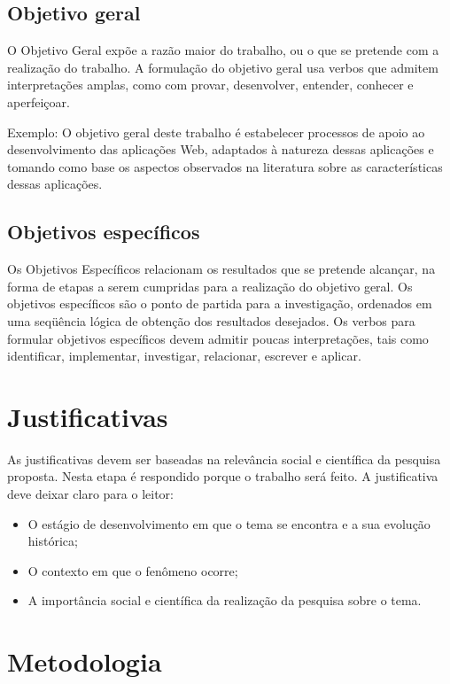 \subsection{Objetivo geral}

O Objetivo Geral expõe a razão maior do trabalho, ou o que se pretende com a
realização do trabalho. A formulação do objetivo geral usa verbos que admitem
interpretações amplas, como com provar, desenvolver, entender, conhecer e
aperfeiçoar.

Exemplo: O objetivo geral deste trabalho é estabelecer processos de apoio ao
desenvolvimento das aplicações Web, adaptados à natureza dessas aplicações e
tomando como base os aspectos observados na literatura sobre as características
dessas aplicações.


\subsection{Objetivos específicos}

Os Objetivos Específicos relacionam os resultados que se pretende alcançar, na
forma de etapas a serem cumpridas para a realização do objetivo geral. Os
objetivos específicos são o ponto de partida para a investigação, ordenados em
uma seqüência lógica de obtenção dos resultados desejados. Os verbos para
formular objetivos específicos devem admitir poucas interpretações, tais como
identificar, implementar, investigar, relacionar, escrever e aplicar.


\section{Justificativas}

As justificativas devem ser baseadas na relevância social e científica da
pesquisa proposta. Nesta etapa é respondido porque o trabalho será feito. A
justificativa deve deixar claro para o leitor:

\begin{itemize}
    \item O estágio de desenvolvimento em que o tema se encontra e a sua
          evolução histórica;
    \item O contexto em que o fenômeno ocorre;
    \item A importância social e científica da realização da pesquisa sobre o
          tema.
\end{itemize}

\section{Metodologia}

